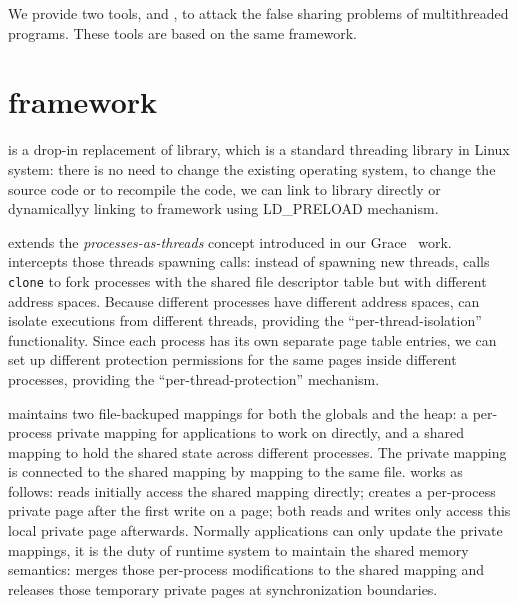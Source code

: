 \label{chapter:sheriff}

We provide two tools, \SheriffDetect{} and \SheriffProtect{}, to attack
the false sharing problems of multithreaded programs. 
These tools are based on the same \sheriff{} framework.

\section{\sheriff{} framework}
\label{sec:framework}

\Sheriff{} is a drop-in replacement of \pthreads{} library, which is a standard threading 
library in Linux system: there is no need to change the 
existing operating system, to change the source code or to recompile the code, 
we can link to \Sheriff{} library directly or dynamicallyy 
linking to \sheriff{} framework using LD\_PRELOAD mechanism. 

\Sheriff{} extends the \emph{processes-as-threads} concept introduced
in our Grace~\cite{grace} work.
\Sheriff{} intercepts those threads spawning calls:
instead of spawning new threads, \sheriff{} calls \texttt{clone} to 
fork processes with the shared file descriptor table but with different address spaces.
Because different processes have different address spaces, 
\sheriff{} can isolate executions from different threads, 
providing the ``per-thread-isolation'' functionality.
Since each process has its own separate page table entries, we can set up different 
protection permissions for the same pages inside different processes, 
providing the ``per-thread-protection'' mechanism.

\sheriff{} maintains two file-backuped mappings for both the globals and the heap: 
a per-process private mapping for applications to work on directly, 
and a shared mapping to hold the shared state across different processes.
The private mapping is connected to the shared mapping by mapping to the same file.
\sheriff{} works as follows: 
reads initially access the shared mapping directly;
\sheriff{} creates a per-process private page after the first write on a page; 
both reads and writes only access this local private page afterwards. 
Normally applications can only update the private mappings, it is the duty of 
\sheriff{} runtime system to maintain the shared memory semantics:
\sheriff{} merges those per-process modifications to the shared mapping and releases those 
temporary private pages at synchronization boundaries. 


